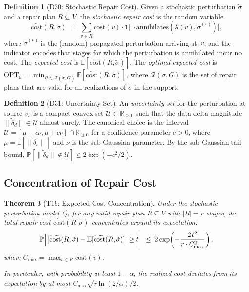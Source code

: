 \documentclass[11pt,a4paper]{article}
\newtheorem{theorem}{Theorem}[section]
\theoremstyle{definition}
\newtheorem{definition}[theorem]{Definition}
\newcommand{\ann}{\mathrm{annihilates}}
\newcommand{\cost}{\mathrm{cost}}
\newcommand{\OPT}{\mathrm{OPT}}
\newcommand{\bbR}{\mathbb{R}}
\newcommand{\bbP}{\mathbb{P}}
\newcommand{\bbE}{\mathbb{E}}
\newcommand{\cR}{\mathcal{R}}
\begin{document}
\begin{definition}[D30: Stochastic Repair Cost]\label{def:stochastic-cost}
Given a stochastic perturbation $\tilde{\sigma}$ and a repair plan
$R \subseteq V$, the \emph{stochastic repair cost} is the random variable
\[
  \widetilde{\cost}(R, \tilde{\sigma})
  \;=\; \sum_{v \in R} \cost(v) \cdot
    \mathbf{1}\bigl[\lnot\,\ann(\lambda(v),
      \tilde{\sigma}^{(v)})\bigr],
\]
where $\tilde{\sigma}^{(v)}$ is the (random) propagated perturbation arriving
at~$v$, and the indicator encodes that stages for which the perturbation is
annihilated incur no cost.
The \emph{expected cost} is $\bbE[\widetilde{\cost}(R, \tilde{\sigma})]$.
The \emph{optimal expected cost} is
$\OPT_{\bbE} = \min_{R \in \cR(\tilde{\sigma}, G)}
\bbE[\widetilde{\cost}(R, \tilde{\sigma})]$,
where $\cR(\tilde{\sigma}, G)$ is the set of repair plans that are valid for
all realizations of $\tilde{\sigma}$ in the support.
\end{definition}

\begin{definition}[D31: Uncertainty Set]\label{def:uncertainty-set}
An \emph{uncertainty set} for the perturbation at source $v_s$ is a compact
convex set $\mathcal{U} \subset \bbR_{\geq 0}$ such that the data delta
magnitude $\|\tilde{\delta}_d\| \in \mathcal{U}$ almost surely.  The canonical
choice is the interval $\mathcal{U} = [\mu - c\nu, \mu + c\nu] \cap
\bbR_{\geq 0}$ for a confidence parameter $c > 0$, where
$\mu = \bbE[\|\tilde{\delta}_d\|]$ and $\nu$ is the sub-Gaussian parameter.
By the sub-Gaussian tail bound, $\bbP[\|\tilde{\delta}_d\| \notin \mathcal{U}]
\leq 2\exp(-c^2/2)$.
\end{definition}

\subsection{Concentration of Repair Cost}

\begin{theorem}[T19: Expected Cost Concentration]\label{thm:cost-concentration}
Under the stochastic perturbation model (), for any
valid repair plan $R \subseteq V$ with $|R| = r$ stages, the total repair cost
$\widetilde{\cost}(R, \tilde{\sigma})$ concentrates around its expectation:
\begin{equation}\label{eq:cost-concentration}
  \bbP\Bigl[\bigl|\widetilde{\cost}(R, \tilde{\sigma})
    - \bbE[\widetilde{\cost}(R, \tilde{\sigma})]\bigr|
    \geq t\Bigr]
  \;\leq\;
  2\exp\!\left(-\frac{2\,t^2}{r \cdot C_{\max}^2}\right),
\end{equation}
where $C_{\max} = \max_{v \in R} \cost(v)$.

In particular, with probability at least $1 - \alpha$, the realized cost
deviates from its expectation by at most
$C_{\max}\sqrt{r \ln(2/\alpha) / 2}$.
\end{theorem}
\end{document}
